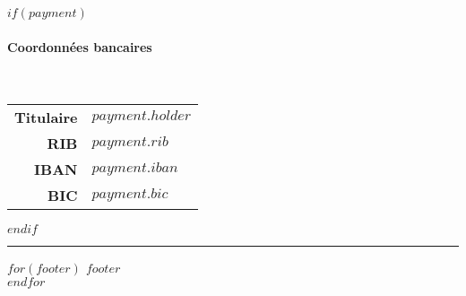 \documentclass[$fontsize$, a4paper]{article}
\begin{document}
\vspace{15mm}

$if(payment)$
\paragraph{Coordonnées bancaires} ~\\[5pt]

\sffamily
\begin{tabular}{rl}
  \textbf{Titulaire} & $payment.holder$ \\
  \textbf{RIB}       & $payment.rib$ \\
  \textbf{IBAN}      & $payment.iban$ \\
  \textbf{BIC}       & $payment.bic$ \\
\end{tabular}
$endif$


\vfill
\rule{\textwidth}{1pt}

\begin{minipage}{\textwidth}
  \footnotesize
  \itshape
  \sffamily
  \onehalfspacing
  \centering
  $for(footer)$
  $footer$ \\
  $endfor$
\end{minipage}
\end{document}
